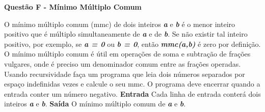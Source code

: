 \documentclass[a4paper, 12pt]{article}
\begin{document}
\newpage %
\begin{center}
\textbf{{\Large Questão F - Mínimo Múltiplo Comum}}
\end{center}
\vspace{5pt}
O mínimo múltiplo comum (mmc) de dois inteiros \textbf{\textit{a}} e \textbf{\textit{b}} é o menor inteiro positivo que é múltiplo simultaneamente de \textbf{\textit{a}} e de \textbf{\textit{b}}. Se não existir tal inteiro positivo, por exemplo, se \textbf{\textit{a = 0}} ou \textbf{\textit{b = 0}}, então \textbf{\textit{mmc(a,b)}} é zero por definição. O mínimo
múltiplo comum é útil em operações de soma e subtração de frações vulgares,
onde é preciso um denominador comum entre as frações operadas. Usando
recursividade faça um programa que leia dois números separados por espaço
indefinidas vezes e calcule o seu mmc. O programa deve encerrar quando a
entrada conter um número negativo.
\newline \newline
\textbf{{\large Entrada}} \newline
Cada linha de entrada conterá dois inteiros \textbf{\textit{a}} e \textbf{\textit{b}}.
\newline \newline
\textbf{{\large Saída}} \newline
O mínimo múltiplo comum de \textbf{\textit{a}} e \textbf{\textit{b}}.
\newline
\end{document}
